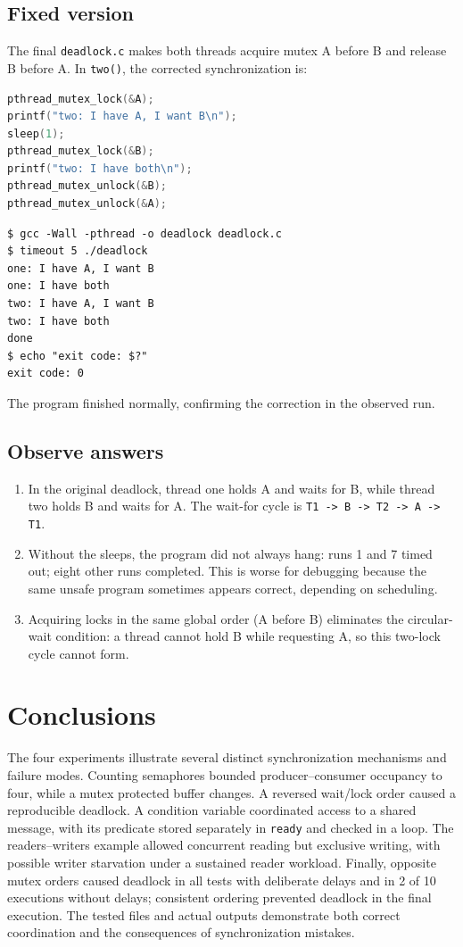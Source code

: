 \documentclass[12pt,a4paper]{article}
\begin{document}
\subsection{Fixed version}
The final \texttt{deadlock.c} makes both threads acquire mutex A before B and release B before A. In \texttt{two()}, the corrected synchronization is:
\begin{lstlisting}[language=C]
pthread_mutex_lock(&A);
printf("two: I have A, I want B\n");
sleep(1);
pthread_mutex_lock(&B);
printf("two: I have both\n");
pthread_mutex_unlock(&B);
pthread_mutex_unlock(&A);
\end{lstlisting}
\begin{lstlisting}
$ gcc -Wall -pthread -o deadlock deadlock.c
$ timeout 5 ./deadlock
one: I have A, I want B
one: I have both
two: I have A, I want B
two: I have both
done
$ echo "exit code: $?"
exit code: 0
\end{lstlisting}
The program finished normally, confirming the correction in the observed run.

\subsection{Observe answers}
\begin{enumerate}[label=\arabic*.]
\item In the original deadlock, thread one holds A and waits for B, while thread two holds B and waits for A. The wait-for cycle is \texttt{T1 -> B -> T2 -> A -> T1}.
\item Without the sleeps, the program did not always hang: runs 1 and 7 timed out; eight other runs completed. This is worse for debugging because the same unsafe program sometimes appears correct, depending on scheduling.
\item Acquiring locks in the same global order (A before B) eliminates the circular-wait condition: a thread cannot hold B while requesting A, so this two-lock cycle cannot form.
\end{enumerate}

\section{Conclusions}
The four experiments illustrate several distinct synchronization mechanisms and failure modes. Counting semaphores bounded producer--consumer occupancy to four, while a mutex protected buffer changes. A reversed wait/lock order caused a reproducible deadlock. A condition variable coordinated access to a shared message, with its predicate stored separately in \texttt{ready} and checked in a loop. The readers--writers example allowed concurrent reading but exclusive writing, with possible writer starvation under a sustained reader workload. Finally, opposite mutex orders caused deadlock in all tests with deliberate delays and in 2 of 10 executions without delays; consistent ordering prevented deadlock in the final execution. The tested files and actual outputs demonstrate both correct coordination and the consequences of synchronization mistakes.
\end{document}
